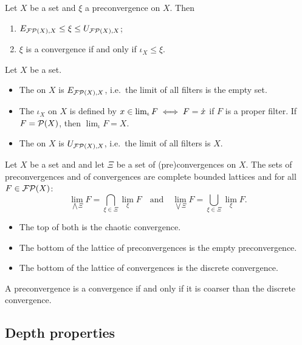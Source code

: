 \begin{lemma}
Let $X$ be a set and $\xi$ a preconvergence on $X$. Then
\begin{enumerate}
\item $E_{\operatorname{\mathcal{FP}}(X), X} \leq \xi \leq U_{\operatorname{\mathcal{FP}}(X), X}$;
\item $\xi$ is a convergence \textup{if and only if} $\iota_X \leq \xi$.
\end{enumerate}
\end{lemma}

\begin{definition}
Let $X$ be a set.
\begin{itemize}
\item The  on $X$ is $E_{\operatorname{\mathcal{FP}}(X), X}$, i.e.\ the limit of all filters is the empty set.
\item The  $\iota_X$ on $X$ is defined by $x \in \lim_\iota F \iff F = \dot{x}$ if $F$ is a proper filter. If $F = \operatorname{\mathcal{P}}(X)$, then $\lim_\iota F = X$.
\item The  on $X$ is $U_{\operatorname{\mathcal{FP}}(X), X}$, i.e.\ the limit of all filters is $X$.
\end{itemize}
\end{definition}

\begin{proposition} \label{latticeConvergences}
Let $X$ be a set and and let $\Xi$ be a set of (pre)convergences on $X$. The sets of preconvergences and of convergences are complete bounded lattices and for all $F \in \operatorname{\mathcal{FP}}(X)$:
\[ \lim_{\bigwedge \Xi} F = \bigcap_{\xi\in\Xi}\lim_\xi F \quad\text{and}\quad \lim_{\bigvee \Xi} F = \bigcup_{\xi\in\Xi}\lim_\xi F. \]
\begin{itemize}
\item The top of both is the chaotic convergence.
\item The bottom of the lattice of preconvergences is the empty preconvergence.
\item The bottom of the lattice of convergences is the discrete convergence.
\end{itemize}
\end{proposition}

\begin{lemma}
A preconvergence is a convergence \textup{if and only if} it is coarser than the discrete convergence.
\end{lemma}


\subsection{Depth properties}
